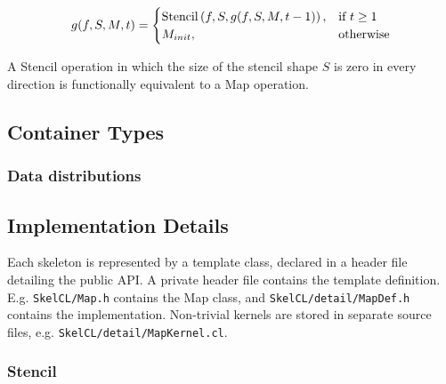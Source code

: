 \begin{equation}
g(f, S, M, t) =
\begin{cases}
  \operatorname*{Stencil} \left( f, S, g(f, S, M, t-1) \right),& \text{if } t \geq 1\\
  M_{init}, & \text{otherwise}
\end{cases}
\end{equation}

A Stencil operation in which the size of the stencil shape $S$ is zero
in every direction is functionally equivalent to a Map operation.



\subsection{Container Types}


\subsubsection{Data distributions}



\subsection{Implementation Details}

Each skeleton is represented by a template class, declared in a header
file detailing the public API. A private header file contains the
template definition. E.g. \texttt{SkelCL/Map.h} contains the Map
class, and \texttt{SkelCL/detail/MapDef.h} contains the
implementation. Non-trivial kernels are stored in separate source
files, e.g. \texttt{SkelCL/detail/MapKernel.cl}.




\subsubsection{Stencil}

